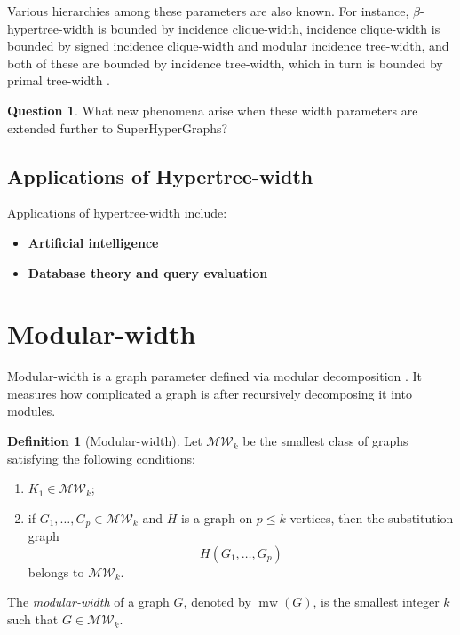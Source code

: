 \documentclass[10pt]{book}
\theoremstyle{definition}
\newtheorem{definition}[theorem]{Definition}
\newtheorem{question}[theorem]{Question}
\begin{document}
Various hierarchies among these parameters are also known.  
For instance, \(\beta\)-hypertree-width is bounded by incidence clique-width, incidence clique-width is bounded by signed incidence clique-width and modular incidence tree-width, and both of these are bounded by incidence tree-width, which in turn is bounded by primal tree-width \cite{fischer2008counting,ganian2021new}.

\begin{question}
What new phenomena arise when these width parameters are extended further to SuperHyperGraphs?
\end{question}

\subsection{Applications of Hypertree-width}

Applications of hypertree-width include:

\begin{itemize}
    \item \textbf{Artificial intelligence} \cite{eiter2002hypergraph,ortiz2017tractable}
    \item \textbf{Database theory and query evaluation} \cite{ghionna2006hypertree,tu2015duncecap}
\end{itemize}

\section{Modular-width}

Modular-width is a graph parameter defined via modular decomposition \cite{42}.  
It measures how complicated a graph is after recursively decomposing it into modules.

\begin{definition}[Modular-width]
\cite{42}
Let \(\mathcal{MW}_k\) be the smallest class of graphs satisfying the following conditions:
\begin{enumerate}
    \item \(K_1\in \mathcal{MW}_k\);
    \item if \(G_1,\dots,G_p\in \mathcal{MW}_k\) and \(H\) is a graph on \(p\leq k\) vertices, then the substitution graph
    \[
    H(G_1,\dots,G_p)
    \]
    belongs to \(\mathcal{MW}_k\).
\end{enumerate}
The \emph{modular-width} of a graph \(G\), denoted by \(\operatorname{mw}(G)\), is the smallest integer \(k\) such that \(G\in \mathcal{MW}_k\).
\end{definition}
\end{document}
